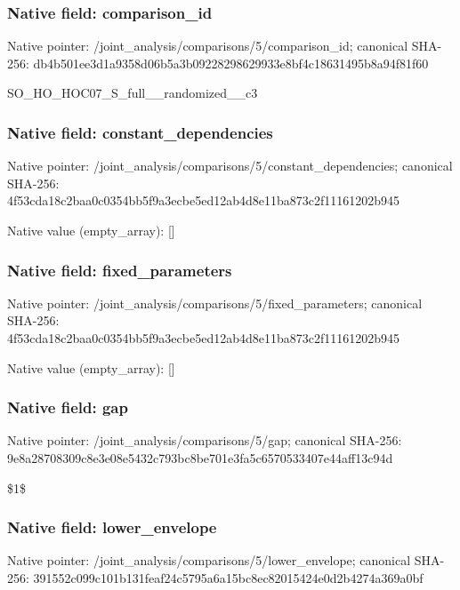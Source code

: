 \documentclass[10pt,a4paper]{article}
\begin{document}
\subsubsection{Native field: comparison\_\allowbreak{}id}
Native pointer: /joint\_\allowbreak{}analysis/comparisons/5/comparison\_\allowbreak{}id; canonical SHA-256: db4b501ee3d1a9358d06b5a3b09228298629933e8bf4c18631495b8a94f81f60

\begingroup\raggedright\sloppy SO\_\allowbreak{}HO\_\allowbreak{}HOC07\_\allowbreak{}S\_\allowbreak{}full\_\allowbreak{}\_\allowbreak{}randomized\_\allowbreak{}\_\allowbreak{}c3\par\endgroup

\subsubsection{Native field: constant\_\allowbreak{}dependencies}
Native pointer: /joint\_\allowbreak{}analysis/comparisons/5/constant\_\allowbreak{}dependencies; canonical SHA-256: 4f53cda18c2baa0c0354bb5f9a3ecbe5ed12ab4d8e11ba873c2f11161202b945

Native value (empty\_\allowbreak{}array): []

\subsubsection{Native field: fixed\_\allowbreak{}parameters}
Native pointer: /joint\_\allowbreak{}analysis/comparisons/5/fixed\_\allowbreak{}parameters; canonical SHA-256: 4f53cda18c2baa0c0354bb5f9a3ecbe5ed12ab4d8e11ba873c2f11161202b945

Native value (empty\_\allowbreak{}array): []

\subsubsection{Native field: gap}
Native pointer: /joint\_\allowbreak{}analysis/comparisons/5/gap; canonical SHA-256: 9e8a28708309c8e3e08e5432c793bc8be701e3fa5c6570533407e44aff13c94d

\begingroup\raggedright\sloppy \$1\$\par\endgroup

\subsubsection{Native field: lower\_\allowbreak{}envelope}
Native pointer: /joint\_\allowbreak{}analysis/comparisons/5/lower\_\allowbreak{}envelope; canonical SHA-256: 391552c099c101b131feaf24c5795a6a15bc8ec82015424e0d2b4274a369a0bf
\end{document}

